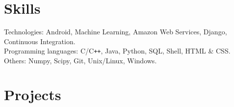 \documentclass[10pt]{article}
\begin{document}
\section*{Skills} Technologies: Android, Machine Learning, Amazon Web
Services, Django, Continuous Integration.\\
Programming languages: C/C\texttt{++}, Java, Python, SQL, Shell,
HTML \& CSS.\\
Others: Numpy, Scipy, Git, Unix/Linux, Windows. 

\section*{Projects}
\end{document}
